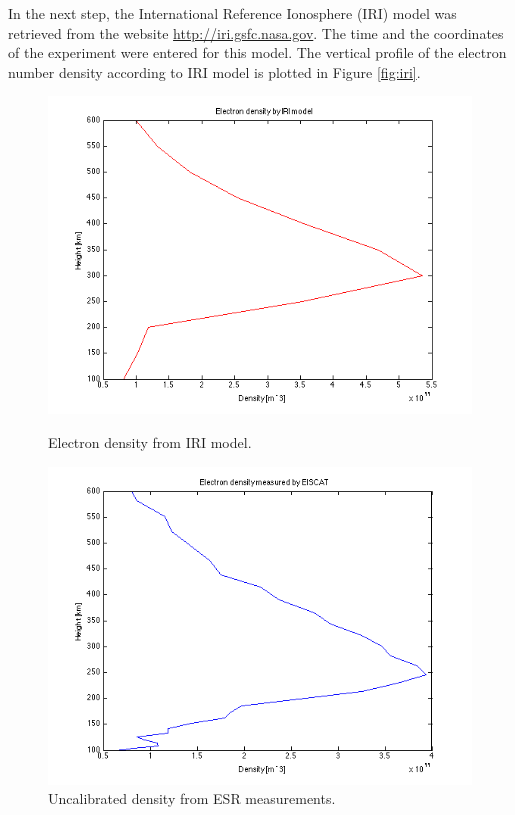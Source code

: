 \documentclass{article}
\begin{document}
In the next step, the International Reference Ionosphere (IRI) model was retrieved from the website \url{http://iri.gsfc.nasa.gov}. The time and the coordinates of the experiment were entered for this model. The vertical profile of the electron number density according to IRI model is plotted in Figure \ref{fig:iri}.
\begin{figure}[h!tb]
	\centering
	\begin{minipage}[t]{0.45\linewidth}
		\includegraphics[width=\textwidth]{Figures/iri.png}
		\caption{Electron density from IRI model.}
		\label{fig:iri}
	\end{minipage}
	\begin{minipage}[t]{0.45\linewidth}
		\includegraphics[width=\textwidth]{Figures/density.png}
		\caption{Uncalibrated density from ESR measurements.}
		\label{fig:density}
	\end{minipage}
\end{figure}
\end{document}
